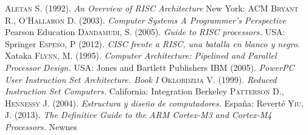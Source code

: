 \documentclass[10pt,a4paper]{article}
\begin{document}
\begin{thebibliography}{X}
\bibitem{}\textsc{Aletan S.} (1992). \textit{An Overview of RISC Architecture} New York: ACM
\bibitem{} \textsc{Bryant R., O’Hallaron D.} (2003). \textit{Computer Systems A Programmer’s Perspective} Pearson Education
\bibitem{}\textsc{Dandamudi, S.} (2005). \textit{Guide to RISC processors.} USA: Springer
 \textsc{Espeso, P} (2012). \textit{CISC frente a RISC, una batalla en blanco y negro}. Xataka
\bibitem{}\textsc{Flynn, M.} (1995). \textit{Computer Architecture: Pipelined and Parallel Processor Design.} USA: Jones and Bartlett Publishers
\bibitem{}\textsc{IBM} (2005). \textit{PowerPC User Instruction Set Architecture. Book I} 
\bibitem{}\textsc{Oklobdzija V.} (1999). \textit{Reduced Instruction Set Computers.} California: Integration Berkeley
\bibitem{}\textsc{Patterson D., Hennessy J.} (2004). \textit{Estructura y diseño de computadores.} España: Reverté
\bibitem{}\textsc{Yiu, J.} (2013). \textit{The Definitive Guide to the ARM Cortex-M3 and Cortex-M4 Processors.} Newnes
\end{thebibliography}
\end{document}
